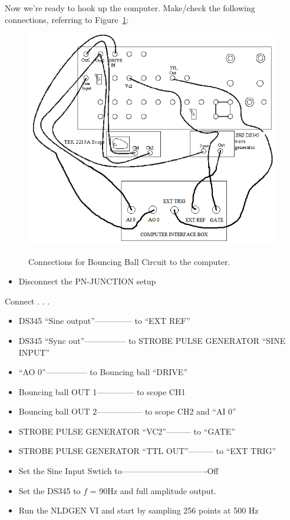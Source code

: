 \documentclass{../lab}
\begin{document}
Now we're ready to hook up the computer. Make/check the following connections, referring to Figure~\ref{fig:ConnectionsForBouncingBallCircuitToComputer}:

\begin{figure}[h]
    \centering
    \href{http://experimentationlab.berkeley.edu/sites/default/files/images/NLD_BALL_DIAGRAM.png}{\includegraphics[width=0.5\linewidth]{images/NLD_BALL_DIAGRAM.png}}
    \caption{Connections for Bouncing Ball Circuit to the computer.}
    \label{fig:ConnectionsForBouncingBallCircuitToComputer}
\end{figure}

\begin{itemize}
    \item Disconnect the PN-JUNCTION setup

\end{itemize}

Connect . . .

\begin{itemize}
    \item DS345 ``Sine output''-------------- to ``EXT REF''

    \item DS345 ``Sync out''--------------- to STROBE PULSE GENERATOR ``SINE INPUT''

    \item ``AO 0''--------------- to Bouncing ball ``DRIVE''

    \item Bouncing ball OUT 1-------------- to scope CH1

    \item Bouncing ball OUT 2----------------- to scope CH2 and ``AI 0''

    \item STROBE PULSE GENERATOR ``VC2''--------- to ``GATE''

    \item STROBE PULSE GENERATOR ``TTL OUT''--------- to ``EXT TRIG''

    \item Set the Sine Input Swtich to-------------------------------Off

    \item Set the DS345 to $f$ = 90Hz and full amplitude output.

    \item Run the NLDGEN VI and start by sampling 256 points at 500 Hz
\end{itemize}
\end{document}
